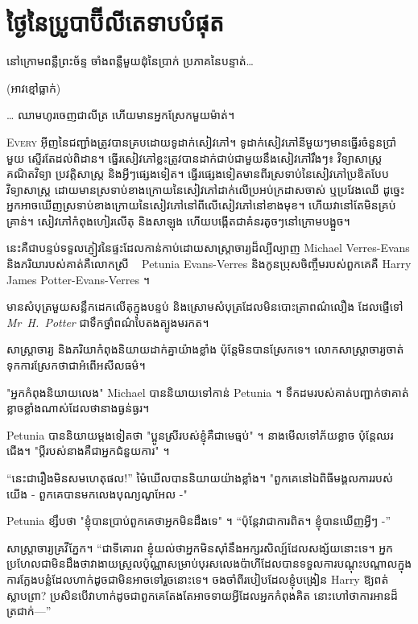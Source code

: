 \chapter{ថ្ងៃនៃប្រូបាប៊ីលីតេទាបបំផុត}

\begin{chapterOpeningQuote}
\noindent
នៅក្រោមពន្លឺព្រះច័ន្ទ ចាំងពន្លឺមួយដុំនៃប្រាក់ ប្រភាគនៃបន្ទាត់…

\vspace*{2ex}
(អាវខ្មៅធ្លាក់)

\vspace*{2ex}
… ឈាម​ហូរ​ចេញ​ជា​លីត្រ ហើយ​មាន​អ្នក​ស្រែក​មួយ​ម៉ាត់។
\end{chapterOpeningQuote}

\lettrine{E}{very} អ៊ីញនៃជញ្ជាំងត្រូវបានគ្របដោយទូដាក់សៀវភៅ។ ទូដាក់សៀវភៅនីមួយៗមានធ្នើរចំនួនប្រាំមួយ ស្ទើរតែដល់ពិដាន។ ធ្នើរសៀវភៅខ្លះត្រូវបានដាក់ជាប់ជាមួយនឹងសៀវភៅរឹងៗ៖ វិទ្យាសាស្ត្រ គណិតវិទ្យា ប្រវត្តិសាស្ត្រ និងអ្វីៗផ្សេងទៀត។ ធ្នើរផ្សេងទៀតមានពីរស្រទាប់នៃសៀវភៅប្រឌិតបែបវិទ្យាសាស្ត្រ ដោយមានស្រទាប់ខាងក្រោយនៃសៀវភៅដាក់លើប្រអប់ក្រដាសចាស់\authorsnotefootnotemark{} ឬប្រវែងឈើ ដូច្នេះអ្នកអាចឃើញស្រទាប់ខាងក្រោយនៃសៀវភៅនៅពីលើសៀវភៅនៅខាងមុខ។ ហើយវានៅតែមិនគ្រប់គ្រាន់។ សៀវភៅកំពុងហៀរលើតុ និងសាឡុង ហើយបង្កើតជាគំនរតូចៗនៅក្រោមបង្អួច។

នេះគឺជាបន្ទប់ទទួលភ្ញៀវនៃផ្ទះដែលកាន់កាប់ដោយសាស្រ្តាចារ្យដ៏ល្បីល្បាញ Michael Verres-Evans និងភរិយារបស់គាត់គឺលោកស្រី ~ Petunia Evans-Verres និងកូនប្រុសចិញ្ចឹមរបស់ពួកគេគឺ Harry James Potter-Evans-Verres ។

មាន​សំបុត្រ​មួយ​សន្លឹក​ដេក​លើ​តុ​ក្នុង​បន្ទប់ និង​ស្រោម​សំបុត្រ​ដែល​មិន​បោះត្រា​ពណ៌​លឿង ដែល​ផ្ញើ​ទៅ \emph{Mr~H.~Potter} ជា​ទឹក​ថ្នាំ​ពណ៌​បៃតង​ត្បូងមរកត។

សាស្ត្រាចារ្យ និង​ភរិយា​កំពុង​និយាយ​ដាក់​គ្នា​យ៉ាង​ខ្លាំង ប៉ុន្តែ​មិន​បាន​ស្រែក​ទេ។ លោក​សាស្ត្រាចារ្យ​ចាត់​ទុក​ការ​ស្រែក​ថា​ជា​អំពើ​អសីលធម៌។

"អ្នកកំពុងនិយាយលេង" Michael បាននិយាយទៅកាន់ Petunia ។ ទឹកដម​របស់​គាត់​បញ្ជាក់​ថា​គាត់​ខ្លាច​ខ្លាំង​ណាស់​ដែល​ថា​នាង​ធ្ងន់ធ្ងរ។

Petunia បាននិយាយម្តងទៀតថា "ប្អូនស្រីរបស់ខ្ញុំគឺជាមេធ្មប់" ។ នាង​មើល​ទៅ​ភ័យ​ខ្លាច ប៉ុន្តែ​ឈរ​ជើង។ "ប្តីរបស់នាងគឺជាអ្នកជំនួយការ" ។

“នេះ​ជា​រឿង​មិន​សម​ហេតុ​ផល!” ម៉ៃឃើលបាននិយាយយ៉ាងខ្លាំង។ "ពួកគេនៅឯពិធីមង្គលការរបស់យើង - ពួកគេបានមកលេងបុណ្យណូអែល -"

Petunia ខ្សឹបថា "ខ្ញុំបានប្រាប់ពួកគេថាអ្នកមិនដឹងទេ" ។ “ប៉ុន្តែវាជាការពិត។ ខ្ញុំបានឃើញអ្វីៗ -”

សាស្រ្តាចារ្យគ្រវីភ្នែក។ “ជាទីគោរព ខ្ញុំយល់ថាអ្នកមិនស៊ាំនឹងអក្សរសិល្ប៍ដែលសង្ស័យនោះទេ។ អ្នកប្រហែលជាមិនដឹងថាវាងាយស្រួលប៉ុណ្ណាសម្រាប់បុរសលេងប៉ាហីដែលបានទទួលការបណ្តុះបណ្តាលក្នុងការក្លែងបន្លំដែលហាក់ដូចជាមិនអាចទៅរួចនោះទេ។ ចងចាំពីរបៀបដែលខ្ញុំបង្រៀន Harry ឱ្យពត់ស្លាបព្រា? ប្រសិនបើវាហាក់ដូចជាពួកគេតែងតែអាចទាយអ្វីដែលអ្នកកំពុងគិត នោះហៅថាការអានដ៏ត្រជាក់—”

